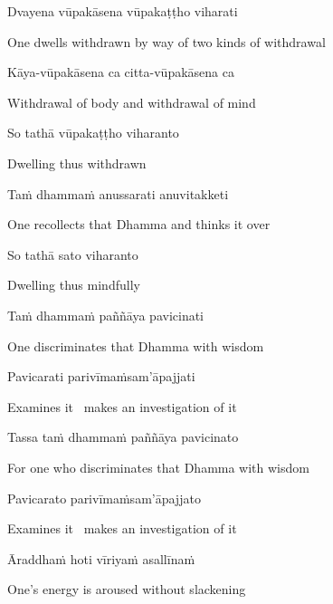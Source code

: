Dvayena vūpakāsena vūpakaṭṭho viharati

\begin{english}
  One dwells withdrawn by way of two kinds of withdrawal
\end{english}

Kāya-vūpakāsena ca citta-vūpakāsena ca

\begin{english}
  Withdrawal of body and withdrawal of mind
\end{english}

So tathā vūpakaṭṭho viharanto

\begin{english}
  Dwelling thus withdrawn
\end{english}

Taṁ dhammaṁ anussarati anuvitakketi

\begin{english}
  One recollects that Dhamma and thinks it over
\end{english}

So tathā sato viharanto

\begin{english}
  Dwelling thus mindfully
\end{english}

Taṁ dhammaṁ paññāya pavicinati

\begin{english}
  One discriminates that Dhamma with wisdom
\end{english}

Pavicarati parivīmaṁsam'āpajjati

\begin{english}
  Examines it \breathmark\ makes an investigation of it
\end{english}

Tassa taṁ dhammaṁ paññāya pavicinato

\begin{english}
  For one who discriminates that Dhamma with wisdom
\end{english}

Pavicarato parivīmaṁsam'āpajjato

\begin{english}
  Examines it \breathmark\ makes an investigation of it
\end{english}

Āraddhaṁ hoti vīriyaṁ asallīnaṁ

\begin{english}
  One's energy is aroused without slackening
\end{english}

